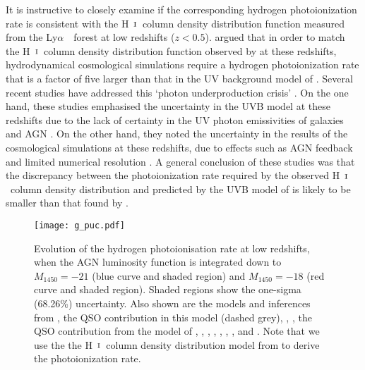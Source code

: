 \documentclass[fleqn,usenatbib]{mnras}
\def\lya{Ly$\alpha$~}
\def\HI{\hbox{H~$\scriptstyle\rm I$}}
\begin{document}
It is instructive to closely examine if the corresponding hydrogen
photoionization rate is consistent with the \HI\ column density
distribution function measured from the \lya\ forest
\citep{2016ApJ...817..111D} at low redshifts ($z<0.5$).
\citet{2014ApJ...789L..32K} argued that in order to match the
\HI\ column density distribution function observed by
\citet{2016ApJ...817..111D} at these redshifts, hydrodynamical
cosmological simulations require a hydrogen photoionization rate that
is a factor of five larger than that in the UV background model of
\citet{2012ApJ...746..125H}.  Several recent studies have addressed
this `photon underproduction crisis' \citep{2015MNRAS.451L..30K,
  2015ApJ...811....3S, 2017MNRAS.467.3172G, 2017MNRAS.467.4802F,
  2017MNRAS.466..838G, 2017MNRAS.467L..86V}.  On the one hand, these
studies emphasised the uncertainty in the \citet{2012ApJ...746..125H}
UVB model at these redshifts due to the lack of certainty in the UV
photon emissivities of galaxies and AGN \citep{2015MNRAS.451L..30K,
  2015ApJ...811....3S}.  On the other hand, they noted the uncertainty
in the results of the cosmological simulations at these redshifts, due
to effects such as AGN feedback and limited numerical resolution
\citep{2015ApJ...811....3S, 2017MNRAS.467L..86V, 2017MNRAS.471.1056N,
  2017ApJ...837..106O, 2017MNRAS.466..838G, 2017MNRAS.467.3172G,
  2017ApJ...835..175G}.  A general conclusion of these studies was
that the discrepancy between the photoionization rate required by the
observed \HI\ column density distribution and predicted by the UVB
model of \citet{2012ApJ...746..125H} is likely to be smaller than that
found by \citet{2014ApJ...789L..32K}.

\begin{figure}
  \begin{center}
    \texttt{[image: g\_puc.pdf]}
  \end{center}
  \caption{Evolution of the hydrogen photoionisation rate at low
    redshifts, when the AGN luminosity function is integrated down to
    $M_{1450}=-21$ (blue curve and shaded region) and $M_{1450}=-18$
    (red curve and shaded region).  Shaded regions show the one-sigma
    (68.26\%) uncertainty.  Also shown are the models and inferences
    from \citet[dotted brown curve]{2012ApJ...746..125H}, the QSO
    contribution in this model (dashed grey), \citet[dotted
      green]{2015ApJ...813L...8M}, \citet[dashed
      black]{2015ApJ...811....3S}, the QSO contribution from the model
    of \citet[dashed orange]{2015MNRAS.451L..30K}, \citet[dotted
      grey]{2017ApJ...837..106O}, \citet[dashed
      brown]{2018arXiv180104931P}, \citet[yellow
      box]{2017MNRAS.467.4802F}, \citet[black
      box]{2017MNRAS.467L..86V}, \citet[inverted
      triangle]{2013MNRAS.436.1023B},
    \citet[pentagon]{2014ApJ...789L..32K}, and
    \citet[circle]{2017MNRAS.467.3172G}. Note that we use the the
    \HI\ column density distribution model from
    \citet{2012ApJ...746..125H} to derive the photoionization rate.
    \label{fig:puc}}
\end{figure}
\end{document}
